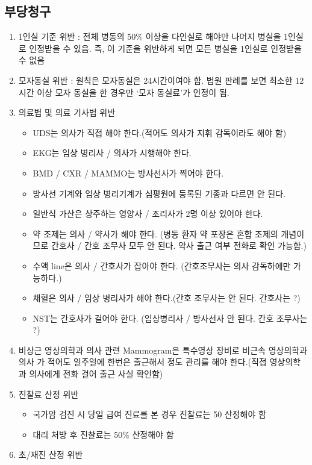 \subsection{부당청구}
\begin{enumerate}[① ]\tightlist
\item 1인실 기준 위반 :
    전체 병동의 50\% 이상을 다인실로 해야만 나머지 병실을 1인실로 인정받을 수 있음. 즉, 이 기준을 위반하게 되면 모든 병실을 1인실로 인정받을 수 없음
\item 모자동실 위반 :
    원칙은 모자동실은 24시간이여야 함. 법원 판례를 보면 최소한 12시간 이상 모자 동실을 한 경우만 ‘모자 동실료’가 인정이 됨.
\item 의료법 및 의료 기사법 위반
	\begin{itemize}\tightlist
	\item UDS는 의사가 직접 해야 한다.(적어도 의사가 지휘 감독이라도 해야 함) 
	\item EKG는 임상 병리사 / 의사가 시행해야 한다.
	\item BMD / CXR / MAMMO는 방사선사가 찍어야 한다.
	\item 방사선 기계와 임상 병리기계가 심평원에 등록된 기종과 다르면 안 된다.
	\item 일반식 가산은 상주하는 영양사 / 조리사가 2명 이상 있어야 한다. 
	\item 약 조제는 의사 / 약사가 해야 한다. (병동 환자 약 포장은 혼합 조제의 개념이므로  간호사 / 간호 조무사 모두 안 된다. 약사 출근 여부 전화로 확인 가능함.)
	\item 수액 line은 의사 / 간호사가 잡아야 한다. (간호조무사는 의사 감독하에만 가능하다.)
	\item 채혈은 의사 / 임상 병리사가 해야 한다.(간호 조무사는 안 된다. 간호사는 ?)
	\item NST는 간호사가 걸어야 한다. (임상병리사 / 방사선사 안 된다. 간호 조무사는 ?)  
	\end{itemize}
\item 비상근 영상의학과 의사 관련
Mammogram은 특수영상 장비로 비근속 영상의학과 의사 가 적어도 일주일에 한번은 출근해서 정도 관리를 해야 한다.(직접 영상의학과 의사에게 전화 걸어 출근 사실 확인함)
\item 진찰료 산정 위반
	\begin{itemize}\tightlist
	\item 국가암 검진 시 당일 급여 진료를 본 경우 진찰료는 50%
   산정해야 함
	\item 대리 처방 후 진찰료는 50\% 산정해야 함
	\end{itemize}	
\item 초/재진 산정 위반

\end{enumerate}
